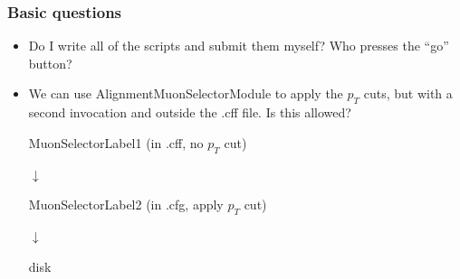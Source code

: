 \documentclass[compress]{beamer}
\begin{document}
\begin{frame}
\frametitle{Basic questions}
\begin{itemize}\setlength{\itemsep}{0.5 cm}
\item Do I write all of the scripts and submit them myself?  Who presses the ``go'' button?
\item We can use AlignmentMuonSelectorModule to apply the $p_T$ cuts,
but with a second invocation and outside the .cff file.  Is this
allowed?
\begin{center}
MuonSelectorLabel1 (in .cff, no $p_T$ cut)

$\downarrow$

MuonSelectorLabel2 (in .cfg, apply $p_T$ cut)

$\downarrow$

disk
\end{center}

\end{itemize}
\end{frame}
\end{document}
